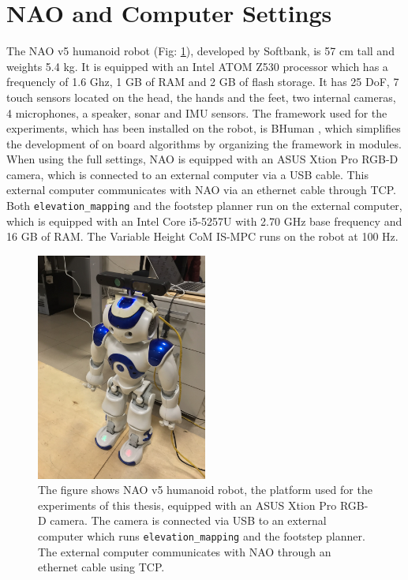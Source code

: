 \section{NAO and Computer Settings}
The NAO v5 humanoid robot (Fig: \ref{fig:nao-with-xtion-2}), developed by 
Softbank, is 57 cm tall and weights 5.4 kg. It is equipped with an Intel ATOM 
Z530 processor which has a frequencly of 1.6 Ghz, 1 GB of RAM and 2 GB of 
flash storage. It has 25 DoF, 7 touch sensors located on the head, the hands 
and the feet, two internal cameras, 4 microphones, a speaker, sonar and IMU 
sensors. The framework used for the experiments, which has been installed on 
the robot, is BHuman \cite{BHumanCodeRelease2018}, which simplifies the 
development of on board algorithms by organizing the framework in modules.
When using the full settings, NAO is equipped with an ASUS Xtion Pro RGB-D
camera,
which is connected to an external computer via a USB cable. This external 
computer communicates with NAO via an ethernet cable through TCP.
Both \texttt{elevation\_mapping} and the footstep planner run on the external 
computer, which is equipped with an Intel Core i5-5257U with 2.70 GHz
base frequency and 16 GB of RAM. The Variable Height CoM IS-MPC runs on the 
robot at 100 Hz. 
\begin{figure}
  \centering
  \includegraphics[width=0.5\textwidth]{figures/NAO-with-xtion-2.JPEG}
  \caption{The figure shows NAO v5 humanoid robot, the platform
      used for the experiments of this thesis, equipped with an ASUS Xtion
      Pro RGB-D camera. The camera is connected via USB to an external 
      computer which runs \texttt{elevation\_mapping} and the footstep 
      planner. The external computer communicates with NAO through an 
      ethernet cable using TCP.}
  \label{fig:nao-with-xtion-2}
\end{figure}

